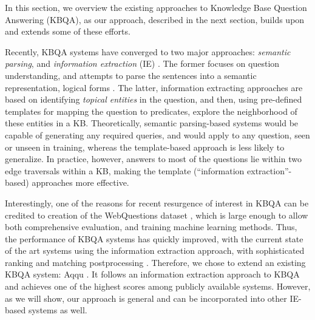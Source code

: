 In this section, we overview the existing approaches to Knowledge Base Question Answering (KBQA), as our approach, described in the next section, builds upon and extends some of these efforts. 

Recently, KBQA systems have converged to two major approaches: {\em semantic parsing}, and {\em information extraction} (IE) \cite{yao2014freebase}.
The former focuses on question understanding, and attempts to parse the sentences into a semantic representation, \eg logical forms \cite{Berant:EMNLP13,berant2014semantic,berant2015imitation}. The latter, information extracting approaches \cite{ACCU:2015,yih2015semantic,yao2014information} are based on identifying \textit{topical entities} in the question, and then, using pre-defined templates for mapping the question to predicates, explore the neighborhood of these entities in a KB.
Theoretically, semantic parsing-based systems would be capable of generating any required queries, and would apply to any question, seen or unseen in training, whereas the template-based approach is less likely to generalize. In practice, however, answers to most of the questions lie within two edge traversals within a KB, making the template (``information extraction''-based) approaches more effective.

Interestingly, one of the reasons for recent resurgence of interest in KBQA can be credited to creation of the WebQuestions dataset \cite{Berant:EMNLP13}, which is large enough to allow both comprehensive evaluation, and training machine learning methods. Thus, the performance of KBQA systems has quickly improved, with the current state of the art systems using the information extraction approach, with sophisticated ranking and matching postprocessing \cite{yih2015semantic}. Therefore, we chose to extend an existing KBQA system: Aqqu \cite{ACCU:2015}.
It follows an information extraction approach to KBQA and achieves one of the highest scores among publicly available systems.
However, as we will show, our approach is general and can be incorporated into other IE-based systems as well.



